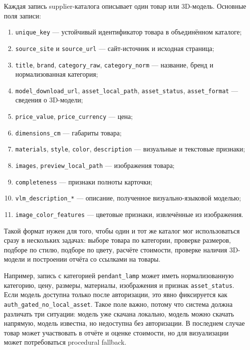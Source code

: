 \documentclass[times]{itmo-student-thesis}
\begin{document}
Каждая запись supplier-каталога описывает один товар или 3D-модель. Основные поля записи:
\begin{enumerate}
  \item \texttt{unique\_key} --- устойчивый идентификатор товара в объединённом каталоге;
  \item \texttt{source\_site} и \texttt{source\_url} --- сайт-источник и исходная страница;
  \item \texttt{title}, \texttt{brand}, \texttt{category\_raw}, \texttt{category\_norm} --- название, бренд и нормализованная категория;
  \item \texttt{model\_download\_url}, \texttt{asset\_local\_path}, \texttt{asset\_status}, \texttt{asset\_format} --- сведения о 3D-модели;
  \item \texttt{price\_value}, \texttt{price\_currency} --- цена;
  \item \texttt{dimensions\_cm} --- габариты товара;
  \item \texttt{materials}, \texttt{style}, \texttt{color}, \texttt{description} --- визуальные и текстовые признаки;
  \item \texttt{images}, \texttt{preview\_local\_path} --- изображения товара;
  \item \texttt{completeness} --- признаки полноты карточки;
  \item \texttt{vlm\_description\_*} --- описание, полученное визуально-языковой моделью;
  \item \texttt{image\_color\_features} --- цветовые признаки, извлечённые из изображения.
\end{enumerate}

Такой формат нужен для того, чтобы один и тот же каталог мог использоваться сразу в нескольких задачах: выборе товара по категории, проверке размеров, подборе по стилю, подборе по цвету, расчёте стоимости, проверке наличия 3D-модели и построении отчёта со ссылками на товары.

Например, запись с категорией \texttt{pendant\_lamp} может иметь нормализованную категорию, цену, размеры, материалы, изображения и признак \texttt{asset\_status}. Если модель доступна только после авторизации, это явно фиксируется как \texttt{auth\_gated\_no\_local\_asset}. Такое поле важно, потому что система должна различать три ситуации: модель уже скачана локально, модель можно скачать напрямую, модель известна, но недоступна без авторизации. В последнем случае товар может участвовать в отчёте и оценке стоимости, но для визуализации может потребоваться procedural fallback.
\end{document}
